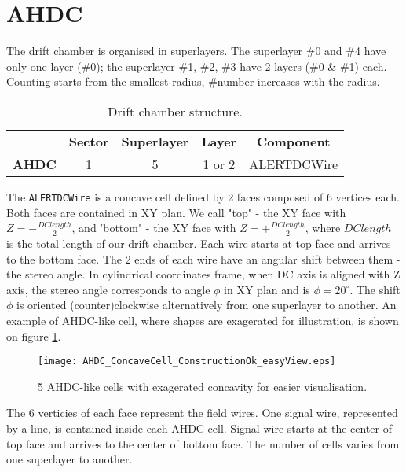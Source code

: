 \section{AHDC}
The drift chamber is organised in superlayers. The superlayer \#0 and \#4 have only one layer (\#0); the superlayer \#1, \#2, \#3 have 2 layers (\#0 \& \#1) each. Counting starts from the smallest radius, \#number increases with the radius.   
\begin{table}[H]
\centering
			\begin{tabular}{ccccc}
              & \textbf{Sector} & \textbf{Superlayer} & \textbf{Layer} & \textbf{Component}                                  \\
\textbf{AHDC} & 1               & 5                   & 1 or 2         & ALERTDCWire
			\end{tabular}
			\label{ahdc_struct}
			\caption{Drift chamber structure.}
	\end{table}	
The \texttt{ALERTDCWire} is a concave cell defined by 2 faces composed of 6 vertices each. Both faces are contained in XY plan. We call "top" - the XY face with $Z = - \frac{DC length}{2}$, and 'bottom" - the XY face with $Z = + \frac{DC length}{2}$, where $DC length$ is the total length of our drift chamber. Each wire starts at top face and arrives to the bottom face. The 2 ends of each wire have an angular shift between them - the stereo angle. In cylindrical coordinates frame, when DC axis is aligned with Z axis, the stereo angle corresponds to angle $\phi$ in XY plan and is $\phi = 20^{\circ}$. The shift  $\phi$ is oriented (counter)clockwise alternatively from one superlayer to another. An example of AHDC-like cell, where shapes are exagerated for illustration, is shown on figure \ref{fig:ahdc_cell}. 
%

\begin{figure}[H]
	\centering
	\texttt{[image: AHDC\_ConcaveCell\_ConstructionOk\_easyView.eps]}
	\caption{5 AHDC-like cells with exagerated concavity for easier visualisation.}
	\label{fig:ahdc_cell}
\end{figure}

The 6 verticies of each face represent the field wires. One signal wire, represented by a line, is contained inside each AHDC cell. Signal wire starts at the center of top face and arrives to the center of bottom face. The number of cells varies from one superlayer to another. 

